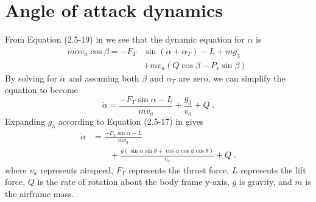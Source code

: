 \section{Angle of attack dynamics} \label{append:alpha_derivation}
From Equation (2.5-19) in \cite{StevensLewis03} we see that the dynamic equation for $\alpha$ is
\begin{align}
m \dot{\alpha} v_a \cos\beta = -F_T &\sin(\alpha + \alpha_T) - L + mg_3 \\
								&+ mv_a(Q\cos\beta - P_s\sin\beta) \nonumber \;
\end{align}
By solving for $\dot{\alpha}$ and assuming both $\beta$ and $\alpha_T$ are zero, we can simplify the equation to become
\begin{equation}
\dot{\alpha} = \frac{-F_T\sin\alpha - L}{mv_a} + \frac{g_3}{v_a} + Q \;.
\end{equation}
Expanding $g_3$ according to Equation (2.5-17) in \cite{StevensLewis03} gives
\begin{align}
\dot{\alpha} &= \frac{-F_T\sin\alpha - L}{mv_a} \\
&\hspace{2em}+ \frac{g(\sin\alpha\sin\theta + \cos\alpha\cos\phi\cos\theta)}{v_a} + Q \nonumber \;.
\end{align}
where $v_a$ represents airspeed, $F_T$ represents the thrust force, $L$ represents the lift force, $Q$ is the rate of rotation about the body frame y-axis, $g$ is gravity, and $m$ is the airframe mass.


